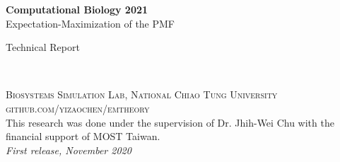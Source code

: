 \documentclass[11pt,fleqn]{book} %
\begin{document}

\begingroup
\thispagestyle{empty}
\centering
\vspace*{5cm}
\par\normalfont\fontsize{35}{35}\sffamily\selectfont
\textbf{Computational Biology 2021}\\
{\LARGE Expectation-Maximization of the PMF}\par %
\vspace*{1cm}
{\Huge Technical Report}\par %
\endgroup


\newpage
~\vfill
\thispagestyle{empty}


\noindent \textsc{Biosystems Simulation Lab, National Chiao Tung University}\\

\noindent \textsc{github.com/yizaochen/emtheory}\\ %

\noindent This research was done under the supervision of Dr. Jhih-Wei Chu with the financial support of MOST Taiwan.\\ %

\noindent \textit{First release, November 2020} %



\pagestyle{empty} %

\tableofcontents %

\end{document}
